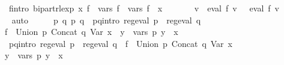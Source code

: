 \begin{isabellebody}
\ \ \ \ \ f{}{\isacharprime}{\kern0pt}{\isacharunderscore}{\kern0pt}intro{\isacharcolon}{\kern0pt}\ {\isachardoublequoteopen}bipart{\isacharunderscore}{\kern0pt}rlexp\ x\ f{}{\isacharprime}{\kern0pt}\ {\isasymand}\ vars\ f{}{\isacharprime}{\kern0pt}\ {\isacharequal}{\kern0pt}\ vars\ f{}\ {\isasymunion}\ {\isacharbraceleft}{\kern0pt}x{\isacharbraceright}{\kern0pt}\ {\isasymand}\isanewline
\ \ \ \ \ \ {\isacharparenleft}{\kern0pt}{\isasymforall}v{\isachardot}{\kern0pt}\ {\isasymPsi}\ {\isacharparenleft}{\kern0pt}eval\ f{}\ v{\isacharparenright}{\kern0pt}\ {\isacharequal}{\kern0pt}\ {\isasymPsi}\ {\isacharparenleft}{\kern0pt}eval\ f{}{\isacharprime}{\kern0pt}\ v{\isacharparenright}{\kern0pt}{\isacharparenright}{\kern0pt}{\isachardoublequoteclose}\isanewline
\ \ \ \ \isamarkupfalse%
\ auto\isanewline
\ \ \isamarkupfalse%
\ \isamarkupfalse%
\ p{}\ q{}\ p{}\ q{}\ \ p{}{\isacharunderscore}{\kern0pt}q{}{\isacharunderscore}{\kern0pt}intro{\isacharcolon}{\kern0pt}\ {\isachardoublequoteopen}reg{\isacharunderscore}{\kern0pt}eval\ p{}\ {\isasymand}\ reg{\isacharunderscore}{\kern0pt}eval\ q{}\ {\isasymand}\isanewline
\ \ \ \ f{}{\isacharprime}{\kern0pt}\ {\isacharequal}{\kern0pt}\ Union\ p{}\ {\isacharparenleft}{\kern0pt}Concat\ q{}\ {\isacharparenleft}{\kern0pt}Var\ x{\isacharparenright}{\kern0pt}{\isacharparenright}{\kern0pt}\ {\isasymand}\ {\isacharparenleft}{\kern0pt}{\isasymforall}y\ {\isasymin}\ vars\ p{}{\isachardot}{\kern0pt}\ y\ {\isasymnoteq}\ x{\isacharparenright}{\kern0pt}{\isachardoublequoteclose}\isanewline
\ \ \ \ \ p{}{\isacharunderscore}{\kern0pt}q{}{\isacharunderscore}{\kern0pt}intro{\isacharcolon}{\kern0pt}\ {\isachardoublequoteopen}reg{\isacharunderscore}{\kern0pt}eval\ p{}\ {\isasymand}\ reg{\isacharunderscore}{\kern0pt}eval\ q{}\ {\isasymand}\ f{}{\isacharprime}{\kern0pt}\ {\isacharequal}{\kern0pt}\ Union\ p{}\ {\isacharparenleft}{\kern0pt}Concat\ q{}\ {\isacharparenleft}{\kern0pt}Var\ x{\isacharparenright}{\kern0pt}{\isacharparenright}{\kern0pt}\ {\isasymand}\isanewline
\ \ \ \ {\isacharparenleft}{\kern0pt}{\isasymforall}y\ {\isasymin}\ vars\ p{}{\isachardot}{\kern0pt}\ y\ {\isasymnoteq}\ x{\isacharparenright}{\kern0pt}{\isachardoublequoteclose}\ \isamarkupfalse%

\end{isabellebody}
